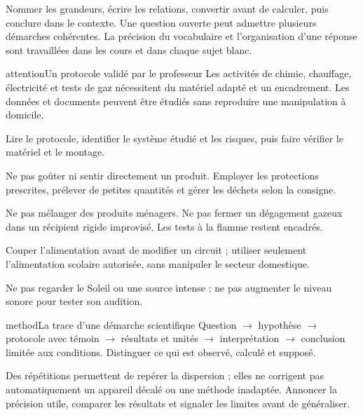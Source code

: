 Nommer les grandeurs, écrire les relations, convertir avant de calculer, puis conclure dans le contexte. Une question ouverte peut admettre plusieurs démarches cohérentes. La précision du vocabulaire et l’organisation d’une réponse sont travaillées dans les cours et dans chaque sujet blanc.
\clearpage{}
\begin{pcEncadre}{attention}{Un protocole validé par le professeur}
Les activités de chimie, chauffage, électricité et tests de gaz nécessitent du matériel adapté et un encadrement. Les données et documents peuvent être étudiés sans reproduire une manipulation à domicile.
\end{pcEncadre}
\begin{questions}
\item Lire le protocole, identifier le système étudié et les risques, puis faire vérifier le matériel et le montage.
\item Ne pas goûter ni sentir directement un produit. Employer les protections prescrites, prélever de petites quantités et gérer les déchets selon la consigne.
\item Ne pas mélanger des produits ménagers. Ne pas fermer un dégagement gazeux dans un récipient rigide improvisé. Les tests à la flamme restent encadrés.
\item Couper l’alimentation avant de modifier un circuit ; utiliser seulement l’alimentation scolaire autorisée, sans manipuler le secteur domestique.
\item Ne pas regarder le Soleil ou une source intense ; ne pas augmenter le niveau sonore pour tester son audition.
\end{questions}
\begin{pcEncadre}{method}{La trace d’une démarche scientifique}
Question $\rightarrow$ hypothèse $\rightarrow$ protocole avec témoin $\rightarrow$ résultats et unités $\rightarrow$ interprétation $\rightarrow$ conclusion limitée aux conditions. Distinguer ce qui est observé, calculé et supposé.
\end{pcEncadre}
Des répétitions permettent de repérer la dispersion ; elles ne corrigent pas automatiquement un appareil décalé ou une méthode inadaptée. Annoncer la précision utile, comparer les résultats et signaler les limites avant de généraliser.
\clearpage{}
